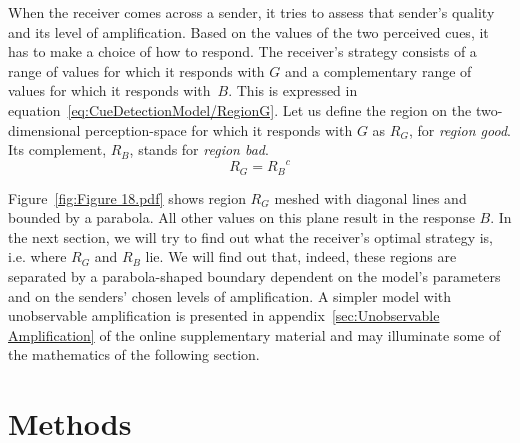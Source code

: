 \documentclass[a4paper,12pt]{article}
\numberwithin{equation}{section}
\numberwithin{figure}{section}
\begin{document}
When the receiver comes across a sender, it tries to assess that sender's quality and its level of amplification. Based on the values of the two perceived cues, it has to make a choice of how to respond. The receiver's strategy consists of a range of values for which it responds with $G$ and a complementary range of values for which it responds with~$B$. This is expressed in equation~\ref{eq:CueDetectionModel/RegionG}. Let us define the region on the two-dimensional perception-space for which it responds with $G$ as $R_{G}$, for \textit{region good}. Its complement, $R_{B}$, stands for \textit{region bad}.
\begin{equation}
\label{eq:CueDetectionModel/RegionG}
R_{G} = {R_{B}}^{c}
\end{equation}

Figure~\ref{fig:Figure 18.pdf} shows region $R_{G}$ meshed with diagonal lines and bounded by a parabola. All other values on this plane result in the response $B$. In the next section, we will try to find out what the receiver's optimal strategy is, i.e. where $R_{G}$ and $R_{B}$ lie. We will find out that, indeed, these regions are separated by a parabola-shaped boundary dependent on the model's parameters and on the senders' chosen levels of amplification. A simpler model with unobservable amplification is presented in appendix~\ref{sec:Unobservable Amplification} of the online supplementary material and may illuminate some of the mathematics of the following section.

\newpage


\section{Methods}
\label{sec:Methods}
\end{document}

